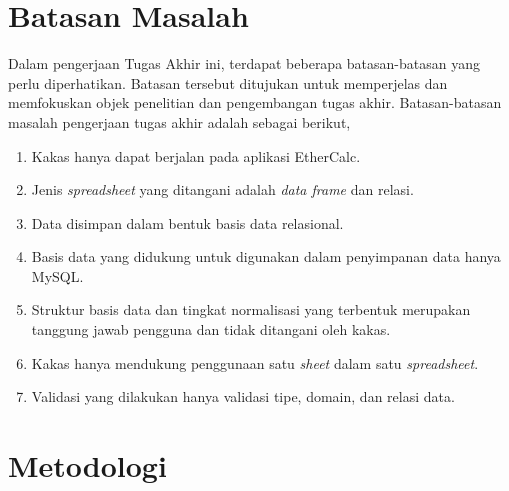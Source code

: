 \section{Batasan Masalah}

Dalam pengerjaan Tugas Akhir ini, terdapat beberapa batasan-batasan yang perlu diperhatikan. Batasan tersebut ditujukan untuk memperjelas dan memfokuskan objek penelitian dan pengembangan tugas akhir. Batasan-batasan masalah pengerjaan tugas akhir adalah sebagai berikut,

\begin{enumerate}
    \item Kakas hanya dapat berjalan pada aplikasi EtherCalc.
    \item Jenis \textit{spreadsheet} yang ditangani adalah \textit{data frame} dan relasi.
    \item Data disimpan dalam bentuk basis data relasional.
    \item Basis data yang didukung untuk digunakan dalam penyimpanan data hanya MySQL.
    \item Struktur basis data dan tingkat normalisasi yang terbentuk merupakan tanggung jawab pengguna dan tidak ditangani oleh kakas.
    \item Kakas hanya mendukung penggunaan satu \textit{sheet} dalam satu \textit{spreadsheet}.
    \item Validasi yang dilakukan hanya validasi tipe, domain, dan relasi data.
\end{enumerate}

\section{Metodologi}

